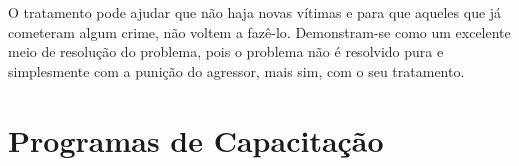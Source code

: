 %
%
%
%
%
%
%
%
%


O tratamento pode ajudar que não haja novas vítimas e para que aqueles que já cometeram algum crime, não voltem a fazê-lo. Demonstram-se como um excelente meio de resolução do problema, pois o problema não é resolvido pura e simplesmente com a punição do agressor, mais sim, com o seu tratamento. 



\section{Programas de Capacitação}\label{sec:programas}



